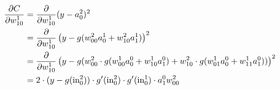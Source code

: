 \documentclass{article}
\begin{document}
    \begin{align*}
        \frac{\partial C}{\partial w_{10}^1} 
        &= \frac{\partial}{\partial w_{10}^1} (y-a_0^2)^2 \\
        &= \frac{\partial}{\partial w_{10}^1} \left(y-g(w_{00}^2 a_0^1  + w_{10}^2 a_1^1)\right)^2 \\
        &= \frac{\partial}{\partial w_{10}^1} \left(y-g(w_{00}^2 \cdot g(w_{00}^1 a_0^0 + w_{10}^1 a_1^0) 
        + w_{10}^2 \cdot g(w_{01}^1 a_0^0 + w_{11}^1 a_1^0 ))\right)^2 \\
        &= 2\cdot (y-g(\text{in}_0^2)) \cdot g'(\text{in}_0^2) 
        \cdot g'(\text{in}_0^1) \cdot a_1^0 w_{00}^2
    \end{align*}
\end{document}
